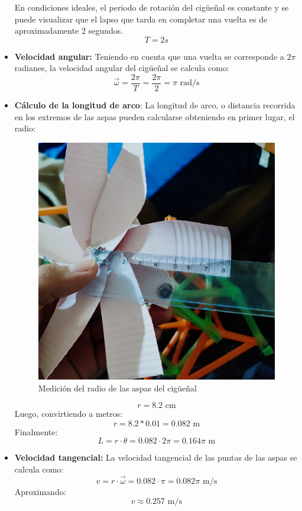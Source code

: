 \begin{multicols}{2}
\begin{itemize}
  En condiciones ideales, el periodo de rotación del cigüeñal es constante y se puede visualizar que el lapso que tarda en completar una vuelta es de aproximadamente 2 segundos.
  \begin{equation}
  T = 2s
  \end{equation}
  \item \textbf{Velocidad angular:} Teniendo en cuenta que una vuelta se corresponde a \(2\pi\) radianes, la velocidad angular del cigüeñal se calcula como:
  \begin{equation}
  \vec{\omega} = \frac{2\pi}{T} = \frac{2\pi}{2} = \pi \text{ rad/s}
  \end{equation}
  \item \textbf{Cálculo de la longitud de arco}: La longitud de arco, o distancia recorrida en los extremos de las aspas pueden calcularse obteniendo en primer lugar, el radio:
  \begin{figure}[H]
    \centering
    \includegraphics[width=0.5\linewidth]{./assets/radio.jpeg}
    \caption{Medición del radio de las aspas del cigüeñal}
    \label{fig:radio_aspas}
  \end{figure}
  \begin{equation}
  r = 8.2 \text{ cm}
  \end{equation}
  Luego, convirtiendo a metros:
  \begin{equation}
  r = 8.2 * 0.01 = 0.082 \text{ m}
  \end{equation}
  Finalmente:
  \begin{equation}
  L = r \cdot \theta = 0.082 \cdot 2\pi = 0.164\pi \text{ m}
  \end{equation}
  \item \textbf{Velocidad tangencial:} La velocidad tangencial de las puntas de las aspas se calcula como:
  \begin{equation}
  v = r \cdot \vec{\omega} = 0.082 \cdot \pi = 0.082\pi \text{ m/s}
  \end{equation}
  Aproximando:
  \begin{equation}
  v \approx 0.257 \text{ m/s}
  \end{equation}
  \end{itemize}

\end{multicols}
